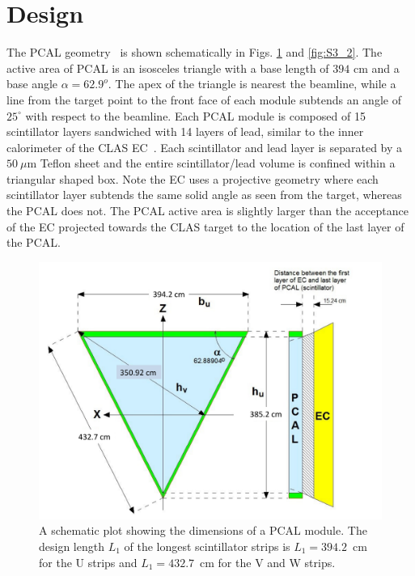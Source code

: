 \section{Design} \label{Design}

The PCAL geometry~\cite{2015002} is shown schematically in Figs. \ref{fig:S3_1} and \ref{fig:S3_2}.   The active area of PCAL is an isosceles triangle with a base length of $394$ cm and a base angle $\alpha=62.9^o$. The apex of the triangle is nearest the beamline, while a line from the target point to the front face of each module subtends an angle of $25^\circ$ with respect to the beamline. Each PCAL module is composed of 15 scintillator layers sandwiched with 14 layers of lead, similar to the inner calorimeter of the CLAS EC~\cite{clas6nim}.  Each scintillator and lead layer is separated by a $50~\mu$m Teflon sheet and the entire scintillator/lead volume is confined within a triangular shaped box. Note the EC uses a projective geometry where each scintillator layer subtends the same solid angle as seen from the target, whereas the PCAL does not.  The PCAL active area is slightly larger than the acceptance of the EC projected towards the CLAS target to the location of the last layer of the PCAL. 

\begin{figure}[h]
\centering
\includegraphics[width=1.0\columnwidth,keepaspectratio]{img/S3_1.pdf}
\caption[Schematic plot of PCAL]{A schematic plot showing the dimensions of a PCAL module. The design length $L_1$ of the longest scintillator strips is $L_1=394.2$~cm for the U strips and $L_1=432.7$~cm for the V and W strips. }
\label{fig:S3_1}
\end{figure}

